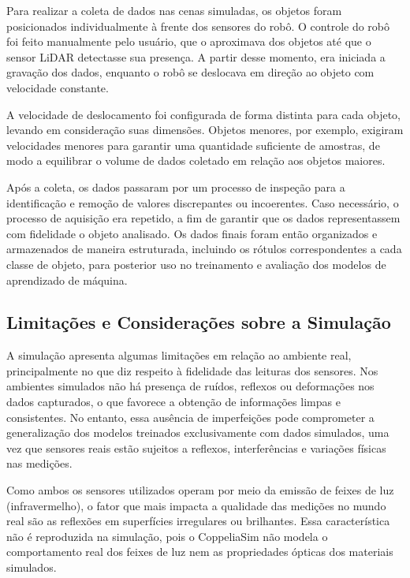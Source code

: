 Para realizar a coleta de dados nas cenas simuladas, os objetos foram posicionados individualmente à frente dos sensores do robô. O controle do robô foi feito manualmente pelo usuário, que o aproximava dos objetos até que o sensor LiDAR detectasse sua presença. A partir desse momento, era iniciada a gravação dos dados, enquanto o robô se deslocava em direção ao objeto com velocidade constante.

A velocidade de deslocamento foi configurada de forma distinta para cada objeto, levando em consideração suas dimensões. Objetos menores, por exemplo, exigiram velocidades menores para garantir uma quantidade suficiente de amostras, de modo a equilibrar o volume de dados coletado em relação aos objetos maiores.

Após a coleta, os dados passaram por um processo de inspeção para a identificação e remoção de valores discrepantes ou incoerentes. Caso necessário, o processo de aquisição era repetido, a fim de garantir que os dados representassem com fidelidade o objeto analisado. Os dados finais foram então organizados e armazenados de maneira estruturada, incluindo os rótulos correspondentes a cada classe de objeto, para posterior uso no treinamento e avaliação dos modelos de aprendizado de máquina.

\subsection{Limitações e Considerações sobre a Simulação}

A simulação apresenta algumas limitações em relação ao ambiente real, principalmente no que diz respeito à fidelidade das leituras dos sensores. Nos ambientes simulados não há presença de ruídos, reflexos ou deformações nos dados capturados, o que favorece a obtenção de informações limpas e consistentes. No entanto, essa ausência de imperfeições pode comprometer a generalização dos modelos treinados exclusivamente com dados simulados, uma vez que sensores reais estão sujeitos a reflexos, interferências e variações físicas nas medições.

Como ambos os sensores utilizados operam por meio da emissão de feixes de luz (infravermelho), o fator que mais impacta a qualidade das medições no mundo real são as reflexões em superfícies irregulares ou brilhantes. Essa característica não é reproduzida na simulação, pois o CoppeliaSim não modela o comportamento real dos feixes de luz nem as propriedades ópticas dos materiais simulados.

